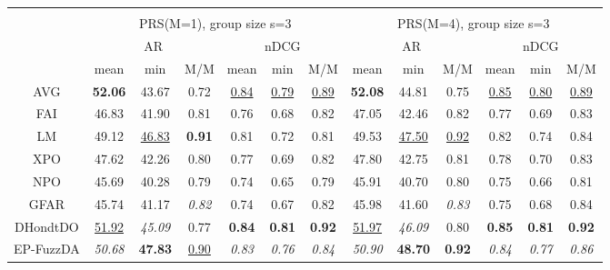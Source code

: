 \begin{tabular}{ c | c c c | c c c || c c c | c c c}
\multicolumn{12}{c}{} \\
\multicolumn{1}{c}{} & \multicolumn{6}{c}{PRS(M=1), group size s=3} & \multicolumn{6}{c}{PRS(M=4), group size s=3} \\
\multicolumn{1}{c}{} & \multicolumn{3}{c}{AR} & \multicolumn{3}{c}{nDCG} & \multicolumn{3}{c}{AR} & \multicolumn{3}{c}{nDCG} \\
& mean & min & M/M & mean & min & M/M & mean & min & M/M & mean & min & M/M \\
\hline
AVG & \textbf{52.06} & 43.67 & 0.72 & \underline{0.84} & \underline{0.79} & \underline{0.89} & \textbf{52.08} & 44.81 & 0.75 & \underline{0.85} & \underline{0.80} & \underline{0.89} \\
FAI & 46.83 & 41.90 & 0.81 & 0.76 & 0.68 & 0.82 & 47.05 & 42.46 & 0.82 & 0.77 & 0.69 & 0.83 \\
LM & 49.12 & \underline{46.83} & \textbf{0.91} & 0.81 & 0.72 & 0.81 & 49.53 & \underline{47.50} & \underline{0.92} & 0.82 & 0.74 & 0.84 \\
XPO & 47.62 & 42.26 & 0.80 & 0.77 & 0.69 & 0.82 & 47.80 & 42.75 & 0.81 & 0.78 & 0.70 & 0.83 \\
NPO & 45.69 & 40.28 & 0.79 & 0.74 & 0.65 & 0.79 & 45.91 & 40.70 & 0.80 & 0.75 & 0.66 & 0.81 \\
GFAR & 45.74 & 41.17 & \textit{0.82} & 0.74 & 0.67 & 0.82 & 45.98 & 41.60 & \textit{0.83} & 0.75 & 0.68 & 0.84 \\
DHondtDO & \underline{51.92} & \textit{45.09} & 0.77 & \textbf{0.84} & \textbf{0.81} & \textbf{0.92} & \underline{51.97} & \textit{46.09} & 0.80 & \textbf{0.85} & \textbf{0.81} & \textbf{0.92} \\
EP-FuzzDA & \textit{50.68} & \textbf{47.83} & \underline{0.90} & \textit{0.83} & \textit{0.76} & \textit{0.84} & \textit{50.90} & \textbf{48.70} & \textbf{0.92} & \textit{0.84} & \textit{0.77} & \textit{0.86} \\


\end{tabular}
